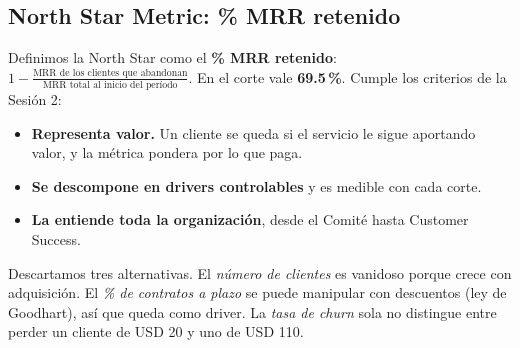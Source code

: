 \documentclass[10.5pt,a4paper]{article}
\begin{document}
\subsection{North Star Metric: \% MRR retenido}
Definimos la North Star como el \textbf{\% MRR retenido}: $1 - \frac{\text{MRR de los clientes que abandonan}}{\text{MRR total al inicio del período}}$. En el corte vale \textbf{69.5\,\%}. Cumple los criterios de la Sesión 2:
\begin{itemize}
  \item \textbf{Representa valor.} Un cliente se queda si el servicio le sigue aportando valor, y la métrica pondera por lo que paga.
  \item \textbf{Se descompone en drivers controlables} y es medible con cada corte.
  \item \textbf{La entiende toda la organización}, desde el Comité hasta Customer Success.
\end{itemize}
Descartamos tres alternativas. El \emph{número de clientes} es vanidoso porque crece con adquisición. El \emph{\% de contratos a plazo} se puede manipular con descuentos (ley de Goodhart), así que queda como driver. La \emph{tasa de churn} sola no distingue entre perder un cliente de USD 20 y uno de USD 110.
\end{document}
